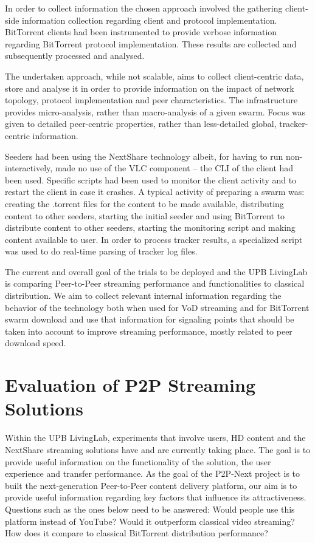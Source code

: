 In order to collect information the chosen approach involved the gathering
client-side information collection regarding client and protocol
implementation. BitTorrent clients had been instrumented to provide verbose
information regarding BitTorrent protocol implementation. These results are
collected and subsequently processed and analysed.

The undertaken approach, while not scalable, aims to collect client-centric
data, store and analyse it in order to provide information on the impact of
network topology, protocol implementation and peer characteristics. The
infrastructure provides micro-analysis, rather than macro-analysis of a given
swarm. Focus was given to detailed peer-centric properties, rather than
less-detailed global, tracker-centric information.

Seeders had been using the NextShare technology albeit, for having to run
non-interactively, made no use of the VLC component -- the CLI of the
client had been used. Specific scripts had been used to monitor the client
activity and to restart the client in case it crashes. A typical activity of
preparing a swarm was: creating the .torrent files for the content to be made
available, distributing content to other seeders, starting the initial seeder
and using BitTorrent to distribute content to other seeders, starting the
monitoring script and making content available to user. In order to process
tracker results, a specialized script was used to do real-time parsing of
tracker log files.

The current and overall goal of the trials to be deployed and the UPB
LivingLab is comparing Peer-to-Peer streaming performance and functionalities
to classical distribution. We aim to collect relevant internal information
regarding the behavior of the technology both when used for VoD streaming and
for BitTorrent swarm download and use that information for signaling points
that should be taken into account to improve streaming performance, mostly
related to peer download speed.

\section{Evaluation of P2P Streaming Solutions}
\label{sec:multimedia-dist:evaluation}

Within the UPB LivingLab, experiments that involve users, HD content and the
NextShare streaming solutions have and are currently taking place. The goal is
to provide useful information on the functionality of the solution, the user
experience and transfer performance. As the goal of the P2P-Next project
is to built the next-generation Peer-to-Peer content delivery platform, our
aim is to provide useful information regarding key factors that influence its
attractiveness. Questions such as the ones below need to be answered: Would people use this platform instead of
YouTube? Would it outperform classical video streaming? How does it compare to
classical BitTorrent distribution performance?

